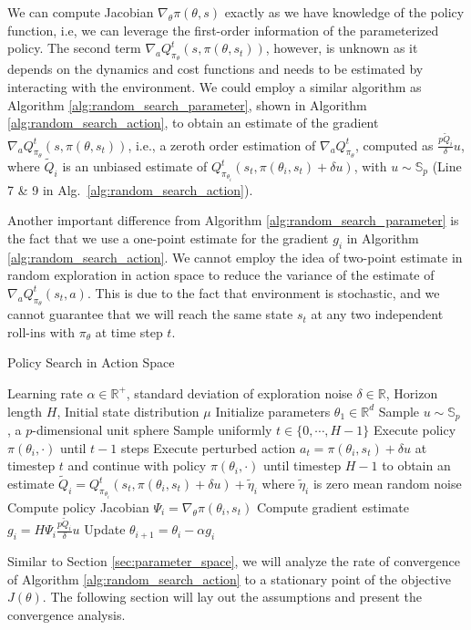 %

We can compute Jacobian $\nabla_{\theta}\pi(\theta,s)$ exactly as we have knowledge of the policy function, i.e, we can leverage the first-order information of the parameterized policy. The
second term $\nabla_a Q_{\pi_\theta}^t(s, \pi(\theta, s_t))$, however, is unknown as it depends on the dynamics and cost functions and
needs to be estimated by interacting with the environment. We could
employ a similar algorithm as Algorithm \ref{alg:random_search_parameter}, shown in Algorithm \ref{alg:random_search_action}, to
obtain an estimate of the gradient $\nabla_a Q_{\pi_\theta}^t(s,
\pi(\theta, s_t))$, i.e., a zeroth order estimation of $\nabla_{a}Q^{t}_{\pi_{\theta}}$, computed as $\frac{p \tilde{Q}_i}{\delta}u$, where $\tilde{Q}_i$ is an unbiased estimate of ${Q}^{t}_{\pi_{\theta_i}}(s_t, \pi(\theta_i,s_t)  + \delta u)$, with $u\sim \mathbb{S}_{p}$ (Line 7 \& 9 in Alg.~\ref{alg:random_search_action}).


Another important difference from Algorithm
\ref{alg:random_search_parameter} is the fact that we use a one-point
estimate for the gradient $g_i$ in Algorithm
\ref{alg:random_search_action}. We cannot employ the idea of two-point estimate  in random exploration
in action space to reduce the variance of the estimate of $\nabla_{a}Q^{t}_{\pi_{\theta}}(s_t,a)$. This is due to the fact that environment is stochastic, and we cannot guarantee that we will reach the same state $s_t$ at any two independent roll-ins with $\pi_{\theta}$ at time step $t$.
\begin{algorithm}[ht]
\caption{Policy Search in Action Space}
 \label{alg:random_search_action}
\begin{algorithmic}[1]
   Learning rate $\alpha \in\mathbb{R}^+$,
  standard deviation of exploration noise $\delta\in\mathbb{R}$,
  Horizon length $H$, Initial state distribution $\mu$
  \State Initialize parameters $\theta_1\in\mathbb{R}^d$
    \State Sample $u \sim \mathbb{S}_p$ , a $p$-dimensional unit
    sphere
    \State Sample uniformly $t \in \{0, \cdots, H-1\}$
    \State Execute policy $\pi(\theta_i, \cdot)$ until $t-1$ steps
    \State Execute perturbed action $a_t = \pi(\theta_i, s_t) + \delta
    u$ at timestep $t$ and continue with policy $\pi(\theta_i, \cdot)$
    until timestep $H-1$
    to obtain an estimate $\tilde{Q}_i = Q^t_{\pi_{\theta_i}}(s_t,
    \pi(\theta_i, s_t) + \delta u) + \tilde{\eta}_i$ where
    $\tilde{\eta}_i$ is zero mean random noise
    \State Compute policy Jacobian
    $\Psi_i = \nabla_\theta \pi(\theta_i, s_t)$
    \State Compute gradient estimate $g_i = H\Psi_i\frac{p\tilde{Q}_i}{\delta}u$
    \State Update $\theta_{i+1} = \theta_i - \alpha g_i$
  \EndFor
\end{algorithmic}
\end{algorithm}
Similar to Section \ref{sec:parameter_space}, we will analyze the rate of convergence of Algorithm \ref{alg:random_search_action}
to a stationary point of the objective $J(\theta)$. The following
section will lay out the assumptions and  present the convergence
analysis.

